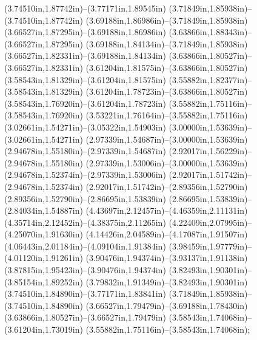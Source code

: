 (3.74510in,1.87742in)--(3.77171in,1.89545in) (3.71849in,1.85938in)--(3.74510in,1.87742in) (3.69188in,1.86986in)--(3.71849in,1.85938in) (3.66527in,1.87295in)--(3.69188in,1.86986in) (3.63866in,1.88343in)--(3.66527in,1.87295in) (3.69188in,1.84134in)--(3.71849in,1.85938in) (3.66527in,1.82331in)--(3.69188in,1.84134in) (3.63866in,1.80527in)--(3.66527in,1.82331in) (3.61204in,1.81575in)--(3.63866in,1.80527in) (3.58543in,1.81329in)--(3.61204in,1.81575in) (3.55882in,1.82377in)--(3.58543in,1.81329in) (3.61204in,1.78723in)--(3.63866in,1.80527in) (3.58543in,1.76920in)--(3.61204in,1.78723in) (3.55882in,1.75116in)--(3.58543in,1.76920in) (3.53221in,1.76164in)--(3.55882in,1.75116in) (3.02661in,1.54271in)--(3.05322in,1.54903in) (3.00000in,1.53639in)--(3.02661in,1.54271in) (2.97339in,1.54687in)--(3.00000in,1.53639in) (2.94678in,1.55180in)--(2.97339in,1.54687in) (2.92017in,1.56229in)--(2.94678in,1.55180in) (2.97339in,1.53006in)--(3.00000in,1.53639in) (2.94678in,1.52374in)--(2.97339in,1.53006in) (2.92017in,1.51742in)--(2.94678in,1.52374in) (2.92017in,1.51742in)--(2.89356in,1.52790in) (2.89356in,1.52790in)--(2.86695in,1.53839in) (2.86695in,1.53839in)--(2.84034in,1.54887in) (4.43697in,2.12457in)--(4.46359in,2.11131in) (4.35714in,2.12452in)--(4.38375in,2.11265in) (4.22409in,2.07995in)--(4.25070in,1.91630in) (4.14426in,2.04589in)--(4.17087in,1.91507in) (4.06443in,2.01184in)--(4.09104in,1.91384in) (3.98459in,1.97779in)--(4.01120in,1.91261in) (3.90476in,1.94374in)--(3.93137in,1.91138in) (3.87815in,1.95423in)--(3.90476in,1.94374in) (3.82493in,1.90301in)--(3.85154in,1.89252in) (3.79832in,1.91349in)--(3.82493in,1.90301in) (3.74510in,1.84890in)--(3.77171in,1.83841in) (3.71849in,1.85938in)--(3.74510in,1.84890in) (3.66527in,1.79479in)--(3.69188in,1.78430in) (3.63866in,1.80527in)--(3.66527in,1.79479in) (3.58543in,1.74068in)--(3.61204in,1.73019in) (3.55882in,1.75116in)--(3.58543in,1.74068in);
